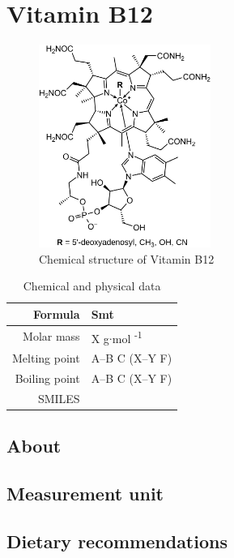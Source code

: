 \documentclass{book}
\begin{document}
\chapter{Vitamin B12}
\begin{figure}[h]
	\caption{Chemical structure of Vitamin B12}
	\centering \includegraphics[width=0.5\textwidth]{images/Vitamin_B12_chemical_structure}
\end{figure}

\begin{table}[h]
	\caption{Chemical and physical data}
	\centering \begin{tabular}{| r | l |}
		\hline
		Formula & Smt\\ \hline
		Molar mass & X g$\cdot$mol \textsuperscript{-1}\\ \hline
		Melting point & A--B \degree C (X--Y \degree F)\\ \hline
		Boiling point & A--B \degree C (X--Y \degree F)\\ \hline
		SMILES & \\ \hline
	\end{tabular}
\end{table}
\newpage

\section{About}


\section{Measurement unit}


\section{Dietary recommendations}
\end{document}
